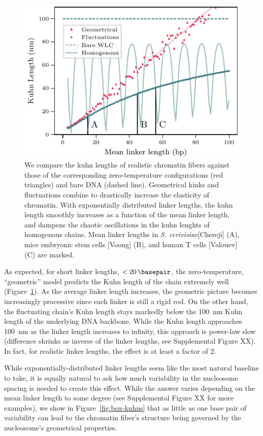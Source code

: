 \documentclass[%
 reprint,
superscriptaddress,
showpacs,preprintnumbers,
 amsmath,amssymb,
 aps,
 prl,
]{revtex4-1}
\begin{document}
\begin{figure}[t]
    \centering
    \includegraphics{./figures/fig3_kuhn_exponential.pdf}
    \caption{We compare the kuhn lengths of realistic chromatin fibers
    against those of the corresponding zero-temperature configurations (red
    triangles) and bare DNA (dashed line). Geometrical kinks and fluctuations
    combine to drastically increase the elasticity of chromatin. With exponentially
    distributed linker lengths, the kuhn length smoothly increases as a function
    of the mean linker length, and dampens the chaotic oscillations in the kuhn
    lenghts of homogenous chains. Mean linker
    lengths in \textit{S.  cerivisiae}[Chereji] (A), mice embryonic stem cells
    [Voong] (B), and human T cells  [Valouev] (C)  are marked.}\label{fig:exp-kuhns}
\end{figure}

As expected, for short linker lengths, $<\SI{20}{\basepair}$, the
    zero-temperature, ``geometric'' model predicts the Kuhn length of the chain
    extremely well (Figure~\ref{fig:exp-kuhns}).
As the average linker length
    increases, the geometric picture becomes increasingly processive since each
    linker is still a rigid rod.
On the other hand, the fluctuating chain's Kuhn length stays markedly below the
    \SI{100}{\nano\metre} Kuhn length of the underlying DNA backbone.
While the Kuhn length approaches \SI{100}{\nano\metre} as the linker length
    increases to infinity, this approach is power-law slow (difference shrinks
    as inverse of the linker lengths, see Supplemental Figure XX).
In fact, for realistic linker lengths, the effect is at least a factor of 2.

While exponentially-distributed linker lengths seem like the most natural
    baseline to take, it is equally natural to ask how much variability in the
    nucleosome spacing is needed to create this effect.
While the answer varies depending on the mean linker length to some degree (see
    Supplemental Figure XX for more examples), we show in
    Figure~\ref{fig:box-kuhns} that as little as one base pair of variability
    can lead to the chromatin fiber's structure being governed by the
    nucleosome's geometrical properties.
\end{document}
